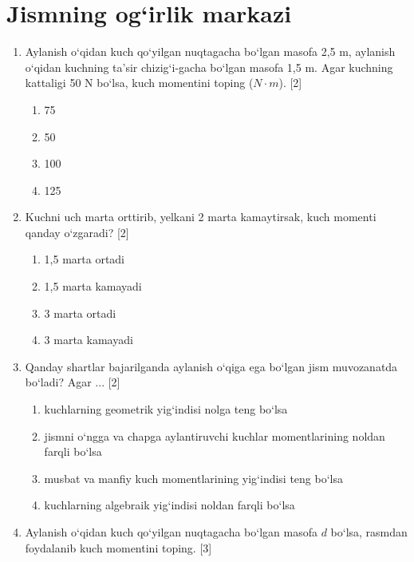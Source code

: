 \section{Jismning og`irlik markazi}

\begin{enumerate}

\item Aylanish o‘qidan kuch qo‘yilgan nuqtagacha bo‘lgan masofa 2,5 m, aylanish o‘qidan kuchning ta’sir chizig‘i-gacha bo‘lgan masofa 1,5 m. Agar kuchning kattaligi 50 N bo‘lsa, kuch momentini toping ($N \cdot m$). [2]
\begin{enumerate}[label=\Alph*)]
\item 75
\item 50
\item 100
\item 125
\end{enumerate}

\item Kuchni uch marta orttirib, yelkani 2 marta kamaytirsak, kuch momenti qanday o‘zgaradi? [2]
\begin{enumerate}[label=\Alph*)]
\item 1,5 marta ortadi
\item 1,5 marta kamayadi
\item 3 marta ortadi
\item 3 marta kamayadi
\end{enumerate}

\item Qanday shartlar bajarilganda aylanish o‘qiga ega bo‘lgan jism muvozanatda bo‘ladi? Agar ... [2]
\begin{enumerate}[label=\Alph*)]
\item kuchlarning geometrik yig‘indisi nolga teng bo‘lsa
\item jismni o‘ngga va chapga aylantiruvchi kuchlar momentlarining noldan farqli bo‘lsa
\item musbat va manfiy kuch momentlarining yig‘indisi teng bo‘lsa
\item kuchlarning algebraik yig‘indisi noldan farqli bo‘lsa
\end{enumerate}

\item Aylanish o‘qidan kuch qo‘yilgan nuqtagacha bo‘lgan masofa $d$ bo‘lsa, rasmdan foydalanib kuch momentini toping. [3]

\end{enumerate}
